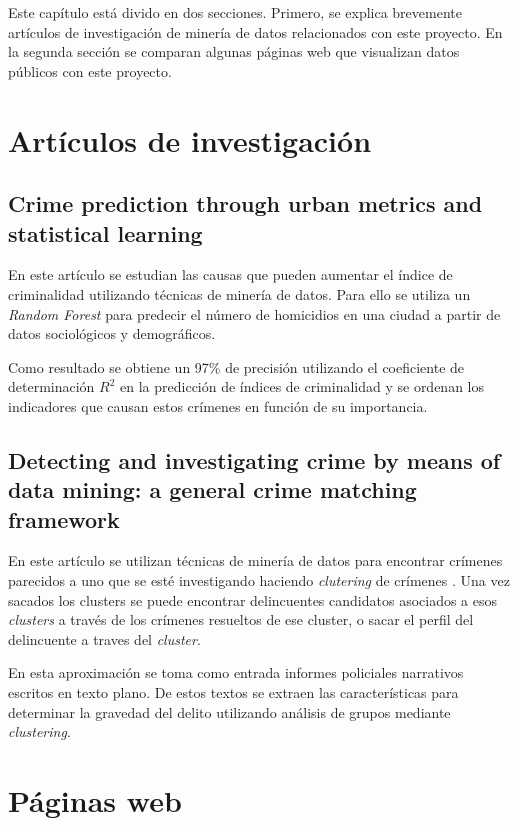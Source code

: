 
Este capítulo está divido en dos secciones. Primero, se explica brevemente artículos de investigación de minería de datos relacionados con este proyecto. En la segunda sección se comparan algunas páginas web que visualizan datos públicos con este proyecto.

\section{Artículos de investigación}

\subsection{Crime prediction through urban metrics and statistical learning}

En este artículo se estudian las causas que pueden aumentar el índice de criminalidad utilizando técnicas de minería de datos. Para ello se utiliza un \textit{Random Forest} para predecir el número de homicidios en una ciudad a partir de datos sociológicos y demográficos. \cite{art:crimeprediction}

Como resultado se obtiene un 97\% de precisión utilizando el coeficiente de determinación $R^{2}$ \cite{wiki:r2} en la predicción de índices de criminalidad y se ordenan los indicadores que causan estos crímenes en función de su importancia.

\subsection{Detecting and investigating crime by means of data mining: a general crime matching framework}

En este artículo se utilizan técnicas de minería de datos para encontrar crímenes parecidos a uno que se esté investigando haciendo \textit{clutering} de crímenes \cite{art:crimeprediction2}. Una vez sacados los clusters se puede encontrar delincuentes candidatos asociados a esos \textit{clusters} a través de los crímenes resueltos de ese cluster, o sacar el perfil del delincuente a traves del \textit{cluster}.

En esta aproximación se toma como entrada informes policiales narrativos escritos en texto plano. De estos textos se extraen las características para determinar la gravedad del delito utilizando análisis de grupos mediante \textit{clustering}.

\section{Páginas web}

